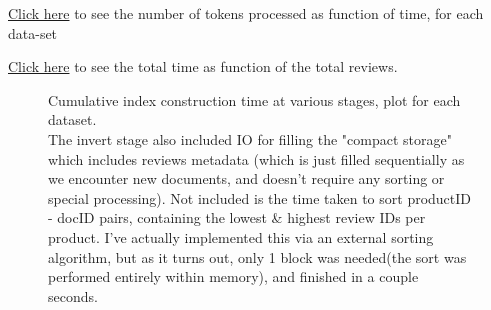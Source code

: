 \documentclass[11pt]{article}
\begin{document}
\hyperref[fig:cumruntime]{Click here} to see the number of tokens processed as function of time, for each data-set

\hyperref[fig:totalruntime]{Click here} to see the total time as function of the total reviews.


\begin{figure}
	\centering
	\caption{Cumulative index construction time at various stages, plot for each dataset.
	\\\hspace{\textwidth}
	The invert stage also included IO for filling the "compact storage" which includes reviews metadata (which is just filled sequentially as
	we encounter new documents, and doesn't require any sorting or special processing).
	Not included is the time taken to sort productID - docID pairs, containing the lowest \& highest review IDs per product.
	I've actually implemented this via an external sorting algorithm, but as it turns out, only 1 block was needed(the sort was performed entirely within memory), and finished in a couple seconds.
	}
	\label{fig:cumruntime}

\end{figure}
\end{document}
